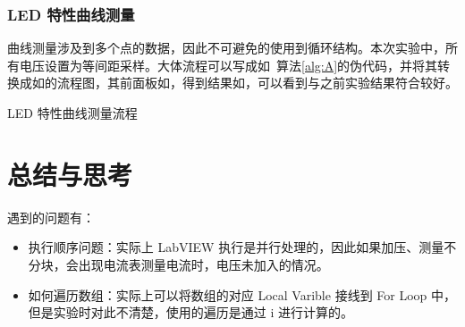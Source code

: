 \documentclass[lang=cn,11pt,a4paper,cite=authoryear]{elegantpaper}
\begin{document}



\subsubsection{LED 特性曲线测量}

曲线测量涉及到多个点的数据，因此不可避免的使用到循环结构。本次实验中，所有电压设置为等间距采样。大体流程可以写成如~算法\ref{alg:A}的伪代码，并将其转换成如的流程图，其前面板如，得到结果如，可以看到与之前实验结果符合较好。






\begin{algorithm}
    \caption{LED 特性曲线测量流程}
    \label{alg:A}
    \begin{algorithmic}
        \REPEAT
    \end{algorithmic}
\end{algorithm}


\section{总结与思考}

遇到的问题有：

\begin{itemize}
    \item 执行顺序问题：实际上 LabVIEW 执行是并行处理的，因此如果加压、测量不分块，会出现电流表测量电流时，电压未加入的情况。
    \item 如何遍历数组：实际上可以将数组的对应 Local Varible 接线到 For Loop 中，但是实验时对此不清楚，使用的遍历是通过 i 进行计算的。
\end{itemize}


\end{document}
